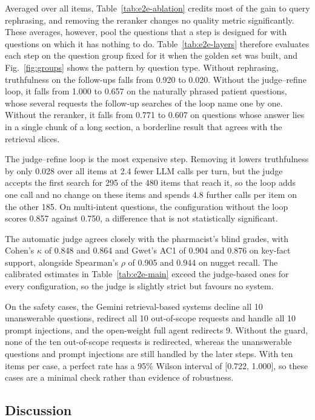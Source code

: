 Averaged over all items, Table~\ref{tab:e2e-ablation} credits most of the gain to query rephrasing, and removing the reranker changes no quality metric significantly. These averages, however, pool the questions that a step is designed for with questions on which it has nothing to do. Table~\ref{tab:e2e-layers} therefore evaluates each step on the question group fixed for it when the golden set was built, and Fig.~\ref{fig:groups} shows the pattern by question type. Without rephrasing, truthfulness on the follow-ups falls from 0.920 to 0.020. Without the judge--refine loop, it falls from 1.000 to 0.657 on the naturally phrased patient questions, whose several requests the follow-up searches of the loop name one by one. Without the reranker, it falls from 0.771 to 0.607 on questions whose answer lies in a single chunk of a long section, a borderline result that agrees with the retrieval slices.

The judge--refine loop is the most expensive step. Removing it lowers truthfulness by only 0.028 over all items at 2.4 fewer LLM calls per turn, but the judge accepts the first search for 295 of the 480 items that reach it, so the loop adds one call and no change on these items and spends 4.8 further calls per item on the other 185. On multi-intent questions, the configuration without the loop scores 0.857 against 0.750, a difference that is not statistically significant.

The automatic judge agrees closely with the pharmacist's blind grades, with Cohen's $\kappa$ of 0.848 and 0.864 and Gwet's AC1 of 0.904 and 0.876 on key-fact support, alongside Spearman's $\rho$ of 0.905 and 0.944 on nugget recall. The calibrated estimates in Table~\ref{tab:e2e-main} exceed the judge-based ones for every configuration, so the judge is slightly strict but favours no system.

On the safety cases, the Gemini retrieval-based systems decline all 10 unanswerable questions, redirect all 10 out-of-scope requests and handle all 10 prompt injections, and the open-weight full agent redirects 9. Without the guard, none of the ten out-of-scope requests is redirected, whereas the unanswerable questions and prompt injections are still handled by the later steps. With ten items per case, a perfect rate has a 95\% Wilson interval of [0.722, 1.000], so these cases are a minimal check rather than evidence of robustness.

\subsection{Discussion}\label{sec:discussion}

